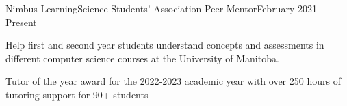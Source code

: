 \begin{resume_employer}{Nimbus Learning}{Science Students' Association Peer Mentor}{}{February 2021 - Present}
    \item Help first and second year students understand concepts and assessments in different computer science courses at the University of Manitoba.
    \item Tutor of the year award for the 2022-2023 academic year with over 250 hours of tutoring support for 90+ students
\end{resume_employer}

